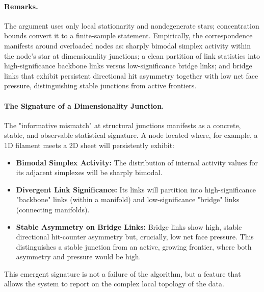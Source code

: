 \documentclass[11pt]{article}
\begin{document}
\paragraph{Remarks.} The argument uses only local stationarity and nondegenerate stars; concentration bounds convert it to a finite-sample statement. Empirically, the correspondence manifests around overloaded nodes as: sharply bimodal simplex activity within the node's star at dimensionality junctions; a clean partition of link statistics into high-significance backbone links versus low-significance bridge links; and bridge links that exhibit persistent directional hit asymmetry together with low net face pressure, distinguishing stable junctions from active frontiers.

\paragraph{The Signature of a Dimensionality Junction.} The "informative mismatch" at structural junctions manifests as a concrete, stable, and observable statistical signature. A node located where, for example, a 1D filament meets a 2D sheet will persistently exhibit:
\begin{itemize}
    \item \textbf{Bimodal Simplex Activity:} The distribution of internal activity values for its adjacent simplexes will be sharply bimodal.
    \item \textbf{Divergent Link Significance:} Its links will partition into high-significance "backbone" links (within a manifold) and low-significance "bridge" links (connecting manifolds).
    \item \textbf{Stable Asymmetry on Bridge Links:} Bridge links show high, stable directional hit-counter asymmetry but, crucially, low net face pressure. This distinguishes a stable junction from an active, growing frontier, where both asymmetry and pressure would be high.
\end{itemize}
This emergent signature is not a failure of the algorithm, but a feature that allows the system to report on the complex local topology of the data.
\end{document}
